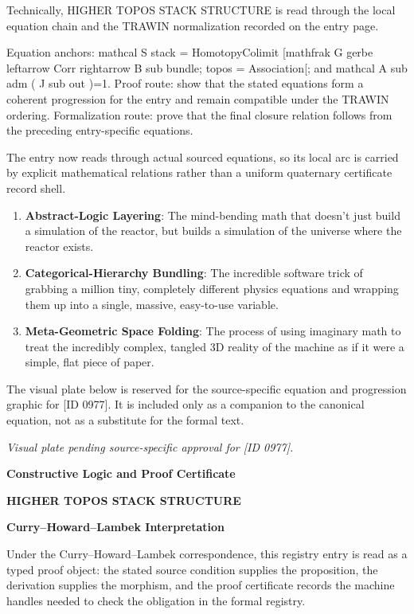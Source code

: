 Technically, HIGHER TOPOS STACK STRUCTURE is read through the local equation chain and the TRAWIN normalization recorded on the entry page.

Equation anchors: mathcal S stack = HomotopyColimit [mathfrak G gerbe leftarrow Corr rightarrow B sub bundle; topos = Association[; and mathcal A sub adm ( J sub out )=1. Proof route: show that the stated equations form a coherent progression for the entry and remain compatible under the TRAWIN ordering. Formalization route: prove that the final closure relation follows from the preceding entry-specific equations.

The entry now reads through actual sourced equations, so its local arc is carried by explicit mathematical relations rather than a uniform quaternary certificate record shell.
\endgroup

\begin{enumerate}[leftmargin=1.6em,itemsep=6pt,topsep=4pt]
\item \textbf{Abstract-Logic Layering}: The mind-bending math that doesn't just build a simulation of the reactor, but builds a simulation of the universe where the reactor exists.
\item \textbf{Categorical-Hierarchy Bundling}: The incredible software trick of grabbing a million tiny, completely different physics equations and wrapping them up into a single, massive, easy-to-use variable.
\item \textbf{Meta-Geometric Space Folding}: The process of using imaginary math to treat the incredibly complex, tangled 3D reality of the machine as if it were a simple, flat piece of paper.
\end{enumerate}

\begingroup\footnotesize\sloppy
The visual plate below is reserved for the source-specific equation and progression graphic for [ID 0977]. It is included only as a companion to the canonical equation, not as a substitute for the formal text.
\par\endgroup
\begingroup\footnotesize\itshape
Visual plate pending source-specific approval for [ID 0977].
\par\endgroup

\clearpage
\begingroup\tzpsupportsetup
\noindent\textbf{\fontsize{10.8pt}{12.8pt}\selectfont [ID 0977] Constructive Logic and Proof Certificate}\par
\noindent\textbf{\fontsize{10pt}{12pt}\selectfont HIGHER TOPOS STACK STRUCTURE}\par
\vspace{0.45em}
\begingroup
\footnotesize
\setlength{\parskip}{0.22em}
\setlength{\parindent}{0pt}
\noindent\textbf{Curry--Howard--Lambek Interpretation}\par
Under the Curry--Howard--Lambek correspondence, this registry entry is read as a typed proof
object: the stated source condition supplies the proposition, the derivation supplies the
morphism, and the proof certificate records the machine handles needed to check the obligation
in the formal registry.

